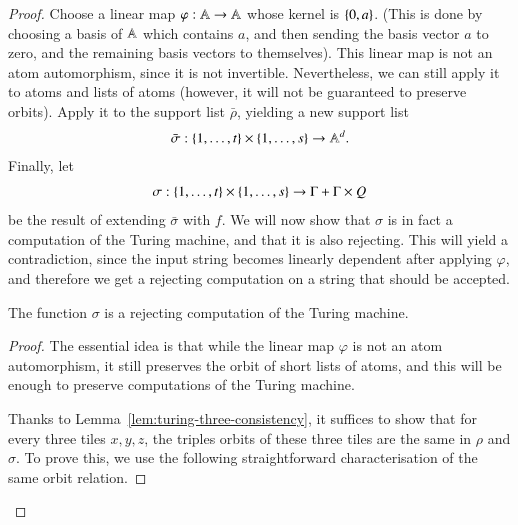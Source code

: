 \begin{proof}
	Choose a linear map $\varphi : \mathbb A \to \mathbb A$ whose kernel is $\{0,a\}$. (This is done by choosing a basis of $\mathbb A$ which contains $a$, and then sending the basis vector $a$ to zero, and the remaining basis vectors to themselves). This linear map is not an atom automorphism, since it is not invertible. Nevertheless, we can still apply it to atoms and lists of atoms (however, it will not be guaranteed to preserve orbits). Apply it to the support list $\bar \rho$, yielding a new support list 
\begin{align*}
	\bar \sigma : \{1,\ldots,t\} \times \{1,\ldots,s\} \to \mathbb A^d.
\end{align*}
Finally, let 
\begin{align*}
	\sigma : \{1,\ldots,t\} \times \{1,\ldots,s\} \to \Gamma + \Gamma \times Q
\end{align*}
be the result of extending $\bar \sigma$ with $f$. We will now show that $\sigma$ is in fact a computation of the Turing machine, and that it is also rejecting. This will yield a contradiction, since the input string becomes linearly dependent after applying $\varphi$, and therefore we get a rejecting computation on a string that should be accepted.
\begin{lemma}
	The function 
	$\sigma$ is a rejecting computation of the Turing machine.	
\end{lemma}
\begin{proof}
	The essential idea is that while the linear map $\varphi$ is not an atom automorphism, it still preserves the orbit of short lists of atoms, and this will be enough to preserve computations of the Turing machine. 

	Thanks to Lemma~\ref{lem:turing-three-consistency}, it suffices to show that for every three tiles $x,y,z$, the triples orbits of these three tiles are the same in $\rho$ and $\sigma$. To prove this, we use the following straightforward characterisation of the same orbit relation.


\end{proof}
\end{proof}
